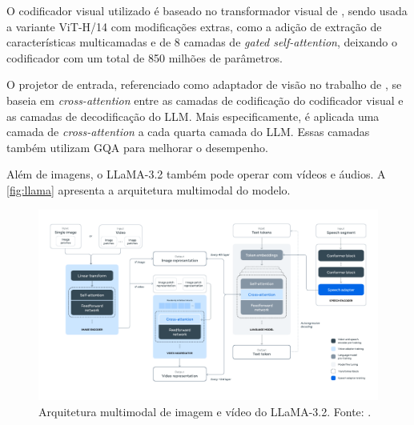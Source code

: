 
O codificador visual utilizado é baseado no transformador visual de \textcite{dosovitskiy2020image}, sendo usada a variante \ac{ViT}-H/14 com modificações extras, como
a adição de extração de características multicamadas e de 8 camadas de \textit{gated self-attention}, deixando o codificador com um total de 850 milhões de parâmetros.

O projetor de entrada, referenciado como adaptador de visão no trabalho de \textcite{dubey2024llama}, se baseia em \textit{cross-attention} entre as camadas de
codificação do codificador visual e as camadas de decodificação do \ac{LLM}. Mais especificamente, é aplicada uma camada de \textit{cross-attention} a cada quarta camada
do \ac{LLM}. Essas camadas também utilizam \ac{GQA} para melhorar o desempenho.

Além de imagens, o \ac{LLaMA}-3.2 também pode operar com vídeos e áudios. A \autoref{fig:llama} apresenta a arquitetura multimodal do modelo.

\begin{figure}[ht]
      \centering
      \includegraphics[width=1.0\columnwidth,keepaspectratio]{images/llama.pdf}
      \caption{\small Arquitetura multimodal de imagem e vídeo do \ac{LLaMA}-3.2. Fonte: \textcite{dubey2024llama}.}
      \label{fig:llama}
\end{figure}
